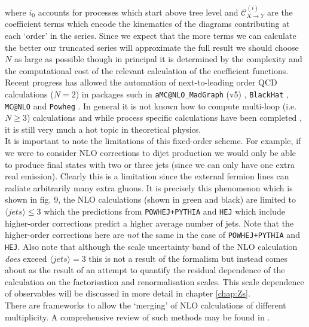 		where $i_0$ accounts for processes which start above tree level and $\mathcal{C}^{(i)}_{X\rightarrow Y}$
		are the coefficient terms which encode the kinematics of the diagrams contributing at each `order'
		in the series.  Since we expect that the more terms we can calculate the better our
		truncated series will approximate the full result we should choose $N$ as large as possible though in principal
		it is determined by the complexity and the computational cost of the relevant calculation of the coefficient
		functions.  Recent progress has allowed the automation of next-to-leading order QCD calculations ($N=2$) in
		packages such in \texttt{aMC@NLO\_MadGraph} (v5) \cite{Alwall:2011uj}, \texttt{BlackHat} \cite{Bern:2012my}, \texttt{MC@NLO}
		\cite{Frixione:2010wd} and \texttt{Powheg} \cite{Frixione:2007vw}.  In general it is not known how to compute
		multi-loop (i.e. $N\geq3$) calculations and while process specific calculations have been completed
		\cite{Cacciari:2015jma, Grazzini:2015nwa, Gehrmann:2014fva}, it is still very much a hot topic in theoretical
		physics.\\It is important to note the limitations of this fixed-order scheme.  For example, if we were to consider
		NLO corrections to dijet production we would only be able to produce final states with two or three jets (since
		we can only have one extra real emission).  Clearly this is a limitation since the external fermion lines can
		radiate arbitrarily many extra gluons.  It is precisely this phenomenon which is shown in fig. 9,
		the NLO calculations (shown in green and black) are limited to $\langle jets\rangle\leq3$ which the predictions
		from \texttt{POWHEJ+PYTHIA} and \texttt{HEJ} which include higher-order corrections predict a higher average
		number of jets.  Note that the higher-order corrections here are \emph{not} the same in the case of
		\texttt{POWHEJ+PYTHIA} and \texttt{HEJ}.  Also note that although the scale uncertainty band of the NLO
		calculation \emph{does} exceed $\langle jets\rangle=3$ this is not a result of the formalism but instead comes
		about as the result of an attempt to quantify the residual dependence of the calculation on the factorisation
		and renormalisation scales.  This scale dependence of observables will be discussed in more detail in chapter
		\ref{chap:Zs}.\\There are frameworks to allow the `merging' of NLO calculations of different multiplicity.  A
		comprehensive review of such methods may be found in \cite{Alwall:2007fs}.

